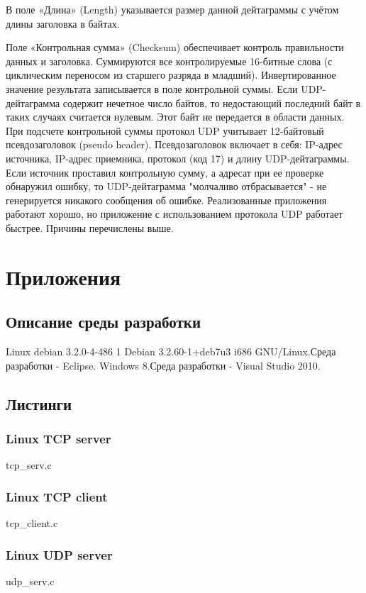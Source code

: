 \documentclass[12pt,a4paper]{report}
\begin{document}
      В поле «Длина» (Length) указывается размер данной дейтаграммы с учётом длины заголовка в байтах.

      Поле «Контрольная сумма» (Checksum) обеспечивает контроль правильности данных и заголовка. Суммируются все контролируемые 16-битные слова (с циклическим переносом из старшего разряда в младший). Инвертированное значение результата записывается в поле контрольной суммы. Если UDP-дейтаграмма содержит нечетное число байтов, то недостающий последний байт в таких случаях считается нулевым. Этот байт не передается в области данных. 
При подсчете контрольной суммы протокол UDP учитывает 12-байтовый псевдозаголовок (pseudo header). Псевдозаголовок включает в себя: IP-адрес источника, IP-адрес приемника, протокол (код 17) и длину UDP-дейтаграммы.
Если источник проставил контрольную сумму, а адресат при ее проверке обнаружил ошибку, то UDP-дейтаграмма "молчаливо отбрасывается" - не генерируется никакого сообщения об ошибке.\newline
Реализованные приложения работают хорошо, но приложение с использованием протокола UDP работает быстрее. Причины перечислены выше. 
\chapter*{Приложения}
\section*{Описание среды разработки}
Linux debian 3.2.0-4-486 1 Debian 3.2.60-1+deb7u3 i686 GNU/Linux.\newline Среда разработки - Eclipse.\newline
Windows 8.\newline Среда разработки - Visual Studio 2010.

\section*{Листинги}
\subsection*{Linux TCP server}

{tcp_serv.c}
\subsection*{Linux TCP client}

{tcp_client.c}
\subsection*{Linux UDP server}

{udp_serv.c}
\end{document}
